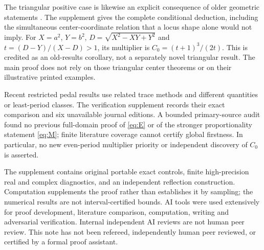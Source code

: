 \documentclass[11pt]{article}
\begin{document}
The triangular positive case is likewise an explicit consequence of
older geometric statements \cite{Book,Center}. The supplement gives
the complete conditional deduction, including the simultaneous
center-coordinate relation that a locus shape alone would not imply.
For $X=a^2$, $Y=b^2$, $D=\sqrt{X^2-XY+Y^2}$ and
$t=(D-Y)/(X-D)>1$, its multiplier is
$C_0=(t+1)^3/(2t)$. This is credited as an old-results corollary,
not a separately novel triangular result. The main proof does not
rely on those triangular center theorems or on their illustrative
printed examples.

Recent restricted pedal results \cite{Recent} use related trace
methods and different quantities or least-period classes. The
verification supplement records their exact comparison and six
unavailable journal editions. A bounded primary-source audit found
no previous full-domain proof of \eqref{eq:E} or of the stronger
proportionality statement \eqref{eq:M}; finite literature coverage cannot certify global
firstness. In particular, no new even-period multiplier priority or
independent discovery of $C_0$ is asserted.

The supplement contains original portable exact controls, finite
high-precision real and complex diagnostics, and an independent
reflection construction. Computation supplements the proof rather
than establishes it by sampling; the numerical results are not
interval-certified bounds. AI tools were used extensively for proof
development, literature comparison, computation, writing and
adversarial verification. Internal independent AI reviews are not
human peer review. This note has not been refereed, independently
human peer reviewed, or certified by a formal proof assistant.
\end{document}
